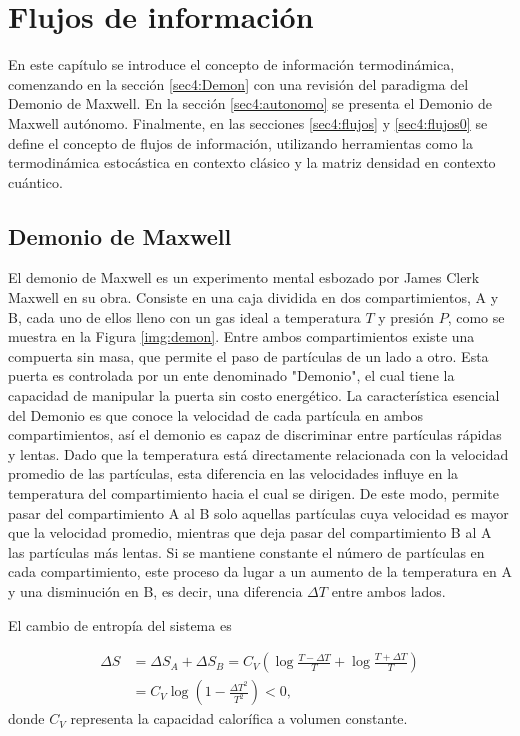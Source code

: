 \chapter{Flujos de información}
En este capítulo se introduce el concepto de información termodinámica, comenzando en la sección \ref{sec4:Demon} con una revisión del paradigma del Demonio de Maxwell. En la sección \ref{sec4:autonomo} se presenta el Demonio de Maxwell autónomo. Finalmente, en las secciones \ref{sec4:flujos} y \ref{sec4:flujos0} se define el concepto de flujos de información, utilizando herramientas como la termodinámica estocástica en contexto clásico y la matriz densidad en contexto cuántico\cite{horowitz2014thermodynamics,ptaszynski2019thermodynamics}.




\section{Demonio de Maxwell}
El demonio de Maxwell es un experimento mental esbozado por James Clerk Maxwell en su obra\cite{Maxwell_1871}. Consiste en una caja dividida en dos compartimientos, A y B, cada uno de ellos lleno con un gas ideal a temperatura $T$ y presión $P$, como se muestra en la Figura \ref{img:demon}. Entre ambos compartimientos existe una compuerta sin masa, que permite el paso de partículas de un lado a otro. Esta puerta es controlada por un ente denominado "Demonio", el cual tiene la capacidad de manipular la puerta sin costo energético. La característica esencial del Demonio es que conoce la velocidad de cada partícula en ambos compartimientos, así el demonio es capaz de discriminar entre partículas rápidas y lentas. Dado que la temperatura está directamente relacionada con la velocidad promedio de las partículas, esta diferencia en las velocidades influye en la temperatura del compartimiento hacia el cual se dirigen. De este modo, permite pasar del compartimiento A al B solo aquellas partículas cuya velocidad es mayor que la velocidad promedio, mientras que deja pasar del compartimiento B al A las partículas más lentas. Si se mantiene constante el número de partículas en cada compartimiento, este proceso da lugar a un aumento de la temperatura en A y una disminución en B, es decir, una diferencia \( \Delta T \) entre ambos lados.

El cambio de entropía del sistema es
 
\begin{align*}
    \Delta S & = \Delta S_{A} + \Delta S_{B} = C_{V}\left( \log \frac{T-\Delta T}{T} + \log \frac{T+\Delta T}{T} \right) \\
       & =  C_{V} \log \left( 1 - \frac{\Delta T^{2}}{T^{2}}  \right) < 0,
\end{align*}
donde \( C_V \) representa la capacidad calorífica a volumen constante.

